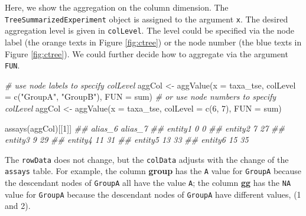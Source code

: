 \documentclass[]{article}
\newcommand{\hlnum}[1]{\textcolor[rgb]{0.816,0.125,0.439}{#1}}%
\newcommand{\hlstr}[1]{\textcolor[rgb]{0.251,0.627,0.251}{#1}}%
\newcommand{\hlcom}[1]{\textcolor[rgb]{0.502,0.502,0.502}{\textit{#1}}}%
\newcommand{\hlstd}[1]{\textcolor[rgb]{0.251,0.251,0.251}{#1}}%
\newcommand{\hlkwc}[1]{\textcolor[rgb]{0.251,0.251,0.251}{#1}}%
\newcommand{\hlkwd}[1]{\textcolor[rgb]{0.878,0.439,0.125}{#1}}%
\newenvironment{Shaded}{\begin{myshaded}}{\end{myshaded}}
\newcommand{\KeywordTok}[1]{\hlkwd{#1}}
\newcommand{\DataTypeTok}[1]{\hlkwc{#1}}
\newcommand{\DecValTok}[1]{\hlnum{#1}}
\newcommand{\StringTok}[1]{\hlstr{#1}}
\newcommand{\CommentTok}[1]{\hlcom{#1}}
\newcommand{\NormalTok}[1]{\hlstd{#1}}
\begin{document}
Here, we show the aggregation on the column dimension. The
\texttt{TreeSummarizedExperiment} object is assigned to the argument \texttt{x}. The desired
aggregation level is given in \texttt{colLevel}. The level could be specified via the
node label (the orange texts in Figure \ref{fig:ctree}) or the node number (the
blue texts in Figure \ref{fig:ctree}). We could further decide how to aggregate
via the argument \texttt{FUN}.

\begin{Shaded}
\begin{Highlighting}[]
\CommentTok{# use node labels to specify colLevel}
\NormalTok{aggCol <-}\StringTok{ }\KeywordTok{aggValue}\NormalTok{(}\DataTypeTok{x =}\NormalTok{ taxa_tse, }
                   \DataTypeTok{colLevel =} \KeywordTok{c}\NormalTok{(}\StringTok{"GroupA"}\NormalTok{, }\StringTok{"GroupB"}\NormalTok{),}
                   \DataTypeTok{FUN =}\NormalTok{ sum)}
\CommentTok{# or use node numbers to specify colLevel}
\NormalTok{aggCol <-}\StringTok{ }\KeywordTok{aggValue}\NormalTok{(}\DataTypeTok{x =}\NormalTok{ taxa_tse, }\DataTypeTok{colLevel =} \KeywordTok{c}\NormalTok{(}\DecValTok{6}\NormalTok{, }\DecValTok{7}\NormalTok{), }\DataTypeTok{FUN =}\NormalTok{ sum)}
\end{Highlighting}
\end{Shaded}

\begin{Shaded}
\begin{Highlighting}[]
\KeywordTok{assays}\NormalTok{(aggCol)[[}\DecValTok{1}\NormalTok{]]}
\CommentTok{##         alias_6 alias_7}
\CommentTok{## entity1       0       0}
\CommentTok{## entity2       7      27}
\CommentTok{## entity3       9      29}
\CommentTok{## entity4      11      31}
\CommentTok{## entity5      13      33}
\CommentTok{## entity6      15      35}
\end{Highlighting}
\end{Shaded}

The \texttt{rowData} does not change, but the \texttt{colData} adjusts with the change of the
\texttt{assays} table. For example, the column \textbf{group} has the \texttt{A} value for
\texttt{GroupA} because the descendant nodes of \texttt{GroupA} all have the value \texttt{A}; the
column \textbf{gg} has the \texttt{NA} value for \texttt{GroupA} because the descendant nodes of
\texttt{GroupA} have different values, (1 and 2).
\end{document}
